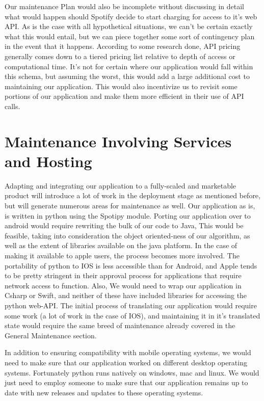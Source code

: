 \documentclass{roffin}
\begin{document}
Our maintenance Plan would also be incomplete without discussing in detail what would happen should Spotify decide to start charging for access to it's web API. As is the case with all hypothetical situations, we can't be certain exactly what this would entail, but we can piece together some sort of contingency plan in the event that it happens.  
According to some research done, API pricing generally comes down to a tiered pricing list relative to depth of access or computational time. It's not for certain where our application would fall within this schema, but assuming the worst, this would add a large additional cost to maintaining our application. This would also incentivize us to revisit some portions of our application and make them more efficient in their use of API calls. 




\section{Maintenance Involving Services and Hosting}
Adapting and integrating our application to a fully-scaled and marketable product will introduce a lot of work in the deployment stage as mentioned before, but will generate numerous areas for maintenance as well. Our application as is, is written in python using the Spotipy module. Porting our application over to android would require rewriting the bulk of our code to Java, This would be feasible, taking into consideration the object oriented-ness of our algorithm, as well as the extent of libraries available on the java platform. In the case of making it available to apple users, the process becomes more involved. The portability of python to IOS is less accessible than for Android, and Apple tends to be pretty stringent in their approval process for applications that require network access to function. Also, We would need to wrap our application in Csharp or Swift, and neither of these have included libraries for accessing the python web-API. The initial process of translating our application would require some work (a lot of work in the case of IOS), and maintaining it in it's translated state would require the same breed of maintenance already covered in the General Maintenance section.

In addition to ensuring compatibility with mobile operating systems, we would need to make sure that our application worked on different desktop operating systems. Fortunately python runs natively on windows, mac and linux. We would just need to employ someone to make sure that our application remains up to date with new releases and updates to these operating systems. 
\end{document}
